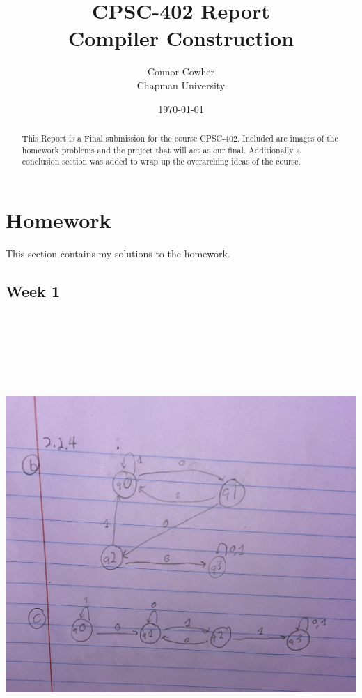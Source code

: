 \documentclass{article}
\title{CPSC-402 Report\\Compiler Construction}
\author{Connor Cowher  \\ Chapman University}
\date{\today}
\theoremstyle{theorem}
\theoremstyle{definition}
\theoremstyle{remark}
\begin{document}
\maketitle

\begin{abstract}
This Report is a Final submission for the course CPSC-402. Included are images of the homework problems and the project that will act as our final. Additionally a conclusion section was added to wrap up the overarching ideas of the course.
\end{abstract}
\clearpage

\tableofcontents

\section{Homework}\label{homework}

This section contains my solutions to the homework. 

\subsection{Week 1}

\medskip\begin{center}
\includegraphics[width=15cm, height=17.5cm]{Week1.pdf}
\end{center}
\end{document}
